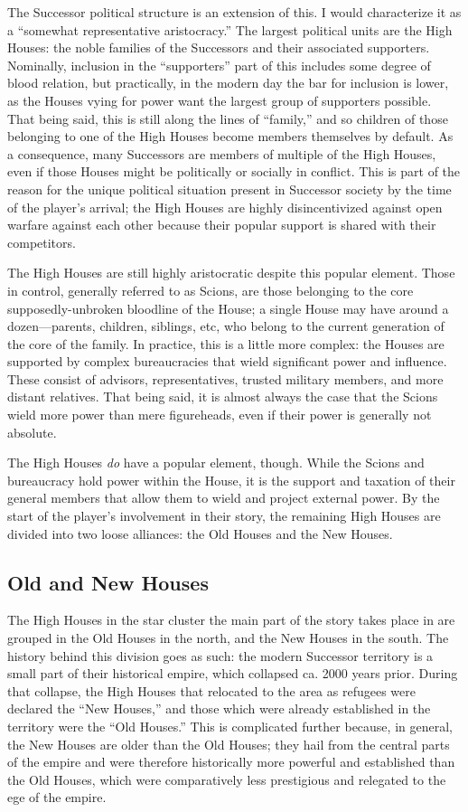 \documentclass[11pt]{report}
\begin{document}
    The Successor political structure is an extension of this. I would characterize it as a ``somewhat representative aristocracy.'' The largest political units are the High Houses: the noble families of the Successors and their associated supporters. Nominally, inclusion in the ``supporters'' part of this includes some degree of blood relation, but practically, in the modern day the bar for inclusion is lower, as the Houses vying for power want the largest group of supporters possible. That being said, this is still along the lines of ``family,'' and so children of those belonging to one of the High Houses become members themselves by default. As a consequence, many Successors are members of multiple of the High Houses, even if those Houses might be politically or socially in conflict. This is part of the reason for the unique political situation present in Successor society by the time of the player's arrival; the High Houses are highly disincentivized against open warfare against each other because their popular support is shared with their competitors.
    
    The High Houses are still highly aristocratic despite this popular element. Those in control, generally referred to as Scions, are those belonging to the core supposedly-unbroken bloodline of the House; a single House may have around a dozen---parents, children, siblings, etc, who belong to the current generation of the core of the family. In practice, this is a little more complex: the Houses are supported by complex bureaucracies that wield significant power and influence. These consist of advisors, representatives, trusted military members, and more distant relatives. That being said, it is almost always the case that the Scions wield more power than mere figureheads, even if their power is generally not absolute.
    
    The High Houses \emph{do} have a popular element, though. While the Scions and bureaucracy hold power within the House, it is the support and taxation of their general members that allow them to wield and project external power. By the start of the player's involvement in their story, the remaining High Houses are divided into two loose alliances: the Old Houses and the New Houses.
    
    \subsection{Old and New Houses}
    The High Houses in the star cluster the main part of the story takes place in are grouped in the Old Houses in the north, and the New Houses in the south. The history behind this division goes as such: the modern Successor territory is a small part of their historical empire, which collapsed ca. 2000 years prior. During that collapse, the High Houses that relocated to the area as refugees were declared the ``New Houses,'' and those which were already established in the territory were the ``Old Houses.'' This is complicated further because, in general, the New Houses are older than the Old Houses; they hail from the central parts of the empire and were therefore historically more powerful and established than the Old Houses, which were comparatively less prestigious and relegated to the ege of the empire.
\end{document}
